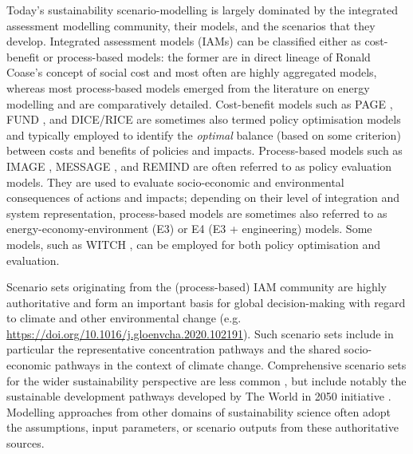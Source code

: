 \documentclass{article}
\begin{document}
\begin{refsection}
Today's sustainability scenario-modelling is largely dominated by the integrated assessment modelling community, their models, and the scenarios that they develop. 
Integrated assessment models (IAMs) can be classified either as cost-benefit or process-based models: 
the former are in direct lineage of Ronald Coase's concept of social cost and most often are highly aggregated models, whereas most process-based models emerged from the literature on energy modelling and are comparatively detailed.\footnotemark{} 
Cost-benefit models such as PAGE \parencite{yumashev_2019}, FUND \parencite{waldhoff_2014}, and DICE/RICE \parencite{nordhaus_2017} are sometimes also termed policy optimisation models and typically employed to identify the \textit{optimal} balance (based on some criterion) between costs and benefits of policies and impacts. 
Process-based models such as IMAGE \parencite{stehfest_2014}, MESSAGE \parencite{huppmann_2019}, and REMIND \parencite{baumstark_2021} are often referred to as policy evaluation models.
They are used to evaluate socio-economic and environmental consequences of actions and impacts; 
depending on their level of integration and system representation, process-based models are sometimes also referred to as energy-economy-environment (E3) or E4 (E3 + engineering) models. 
Some models, such as WITCH \parencite{bosetti_2006,emmerling_2016}, can be employed for both policy optimisation and evaluation.


Scenario sets originating from the (process-based) IAM community are highly authoritative and form an important basis for global decision-making with regard to climate and other environmental change (e.g. \url{https://doi.org/10.1016/j.gloenvcha.2020.102191}). 
Such scenario sets include in particular the representative concentration pathways \parencite[RCPs;][]{vanvuuren_2011_rcp} and the shared socio-economic pathways \parencite[SSPs;][]{riahi_2017,oneill_2014} in the context of climate change. 
Comprehensive scenario sets for the wider sustainability perspective are less common \parencite{vansoest_2019}, but include notably the sustainable development pathways developed by The World in 2050 initiative \parencite{twi_2018}. 
Modelling approaches from other domains of sustainability science often adopt the assumptions, input parameters, or scenario outputs from these authoritative sources.


\end{refsection}
\end{document}

